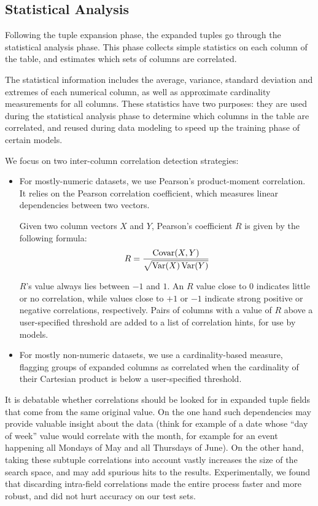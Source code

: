 \subsection{Statistical Analysis}
\label{sec:statistical-analysis}

Following the tuple expansion phase, the expanded tuples go through the statistical analysis phase. This phase collects simple statistics on each column of the table, and estimates which sets of columns are correlated.

The statistical information includes the average, variance, standard deviation and extremes of each numerical column, as well as approximate cardinality measurements for all columns. These statistics have two purposes: they are used during the statistical analysis phase to determine which columns in the table are correlated, and reused during data modeling to speed up the training phase of certain models.

We focus on two inter-column correlation detection strategies:

\begin{itemize}
\item For mostly-numeric datasets, we use Pearson's product-moment
  correlation. It relies on the Pearson correlation coefficient,
  which measures linear dependencies between two vectors.

  Given two column vectors $X$ and $Y$, Pearson's coefficient $R$ is given by the following formula:
  \begin{align}
    \label{eqn:pearson}
    R = \frac{\operatorname{Covar}(X,Y)}{\sqrt{\operatorname{Var}(X)\operatorname{Var}(Y)}}
  \end{align}

  $R$'s value always lies between $-1$ and $1$. An $R$ value close to 0 indicates little or no correlation, while values close to $+1$ or $-1$ indicate strong positive or negative correlations, respectively. Pairs of columns with a value of \(R\) above a user-specified threshold are added to a list of correlation hints, for use by models.
\item For mostly non-numeric datasets, we use a cardinality-based measure, flagging groups of expanded columns as correlated when the cardinality of their Cartesian product is below a user-specified threshold.
\end{itemize}

It is debatable whether correlations should be looked for in expanded tuple fields that come from the same original value. On the one hand such dependencies may provide valuable insight about the data (think for example of a date whose ``day of week'' value would correlate with the month, for example for an event happening all Mondays of May and all Thursdays of June). On the other hand, taking these subtuple correlations into account vastly increases the size of the search space, and may add spurious hits to the results. Experimentally, we found that discarding intra-field correlations made the entire process faster and more robust, and did not hurt accuracy on our test sets.

